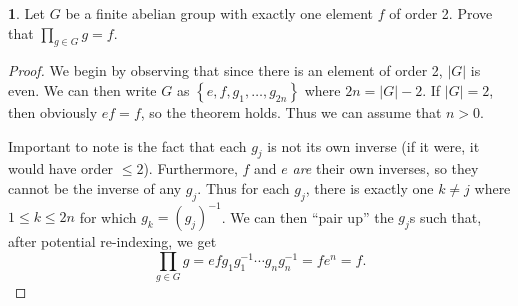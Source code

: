 \documentclass{article}
\theoremstyle{definition}
\newtheorem{ex}{}[section]
\begin{document}
\begin{ex}
	Let $G$ be a finite abelian group with exactly one element $f$ of order 2.
	Prove that $\prod_{g \in G} g = f$.
\end{ex}
\begin{proof}
	We begin by observing that since there is an element of order 2, $|G|$ is even.
	We can then write $G$ as $\left\lbrace e, f, g_1, \dots, g_{2n} \right\rbrace$ where $2n = |G| - 2$.
	If $|G| = 2$, then obviously $ef = f$, so the theorem holds.
	Thus we can assume that $n > 0$.

	Important to note is the fact that each $g_j$ is not its own inverse (if it were, it would have order $\leq 2$).
	Furthermore, $f$ and $e$ \textit{are} their own inverses, so they cannot be the inverse of any $g_j$.
	Thus for each $g_j$, there is exactly one $k \neq j$ where $1 \leq k \leq 2n$ for which $g_k = (g_j)^{-1}$.
	We can then ``pair up'' the $g_j$s such that, after potential re-indexing, we get \begin{equation*}
		\prod_{g \in G} g = efg_1g_1^{-1}\cdots g_ng_n^{-1} = fe^n = f.
	\end{equation*}
\end{proof}
\end{document}
